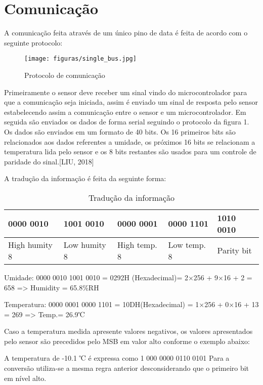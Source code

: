 \section{Comunicação}

A comunicação feita através de um único pino de data é feita de acordo com o seguinte protocolo:

\begin{figure}[H]
	\centering
	\texttt{[image: figuras/single\_bus.jpg]}
	\caption{Protocolo de comunicação} 
	\label{single_bus}
\end{figure}

Primeiramente o sensor deve receber um sinal vindo do microcontrolador para que a comunicação seja iniciada, assim é enviado um sinal de resposta pelo sensor estabelecendo assim a comunicação entre o sensor e um microcontrolador. Em seguida são enviados os dados de forma serial seguindo o protocolo da figura 1. Os  dados são enviados em um formato de 40 bits. Os 16 primeiros bits são relacionados aos dados referentes a umidade, os próximos 16 bits se relacionam a temperatura lida pelo sensor e os 8 bits restantes são usados para um controle de paridade do sinal\cite{liu2018}.[LIU, 2018]

A tradução da informação é feita da seguinte forma:

\begin{table}[H]
	\centering
	\caption{Tradução da informação}
	\label{my-label}
	\begin{tabular}{|l|l|l|l|l|}
		\hline
		{0000 0010} & {1001 0010} & {0000 0001} & {0000 1101} & {1010 0010} \\ \hline
		High humity 8   & Low humity 8    & High temp. 8    & Low temp. 8     & Parity bit      \\ \hline
	\end{tabular}
\end{table}


Umidade: 0000 0010  1001 0010 = 0292H (Hexadecimal)= 2×256 + 9×16 + 2 = 658    => Humidity = 65.8\%RH

Temperatura: 0000 0001  0000 1101 = 10DH(Hexadecimal) = 1×256 + 0×16 + 13 = 269   => Temp.= 26.9℃ 

Caso a temperatura medida apresente valores negativos, os valores apresentados pelo sensor são precedidos pelo MSB em valor alto conforme o exemplo abaixo:

A temperatura de -10.1 ℃ é expressa como 1 000 0000 0110 0101
Para a conversão utiliza-se a mesma regra anterior desconsiderando que o primeiro bit em nível alto.

